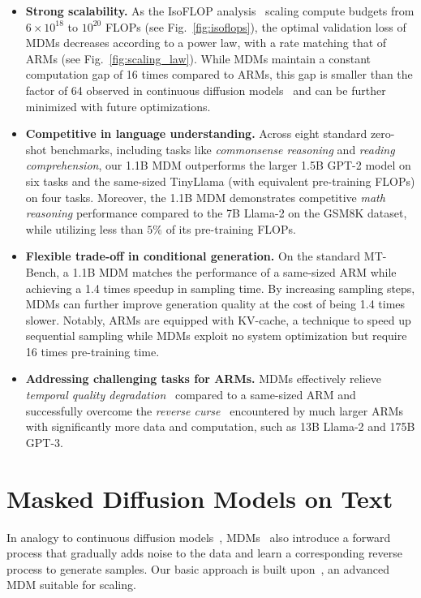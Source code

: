 \documentclass{article} %
\begin{document}
\begin{itemize}[leftmargin=*, itemsep=0pt]
    \item \textbf{Strong scalability.} As the IsoFLOP analysis~\citep{hoffmann2022training} scaling compute budgets from $6 \times 10^{18}$ to $10^{20}$ FLOPs (see Fig.~\ref{fig:isoflops}), the optimal validation loss of MDMs decreases according to a power law, with a rate matching that of ARMs (see Fig.~\ref{fig:scaling_law}). While MDMs maintain a constant computation gap of 16 times compared to ARMs, this gap is smaller than the factor of 64 observed in continuous diffusion models~\citep{gulrajani2024likelihood} and can be further minimized with future optimizations.
    \item \textbf{Competitive in language understanding.} Across eight standard zero-shot benchmarks, including tasks like \emph{commonsense reasoning} and \emph{reading comprehension}, our 1.1B MDM outperforms the larger 1.5B GPT-2 model on six tasks and the same-sized TinyLlama (with equivalent pre-training FLOPs) on four tasks. Moreover, the 1.1B MDM demonstrates competitive \emph{math reasoning} performance compared to the 7B Llama-2 on the GSM8K dataset, while utilizing less than $5\%$ of its pre-training FLOPs.
    \item \textbf{Flexible trade-off in conditional generation.} On the standard MT-Bench, a 1.1B MDM matches the performance of a same-sized ARM while achieving a 1.4 times speedup in sampling time. By increasing sampling steps, MDMs can further improve generation quality at the cost of being 1.4 times slower. Notably, ARMs are equipped with KV-cache, a technique to speed up sequential sampling while MDMs exploit no system optimization but require 16 times pre-training time.
    \item \textbf{Addressing challenging tasks for ARMs.} MDMs effectively relieve \emph{temporal quality degradation}~\citep{vela2022temporal} compared to a same-sized ARM and successfully overcome the \emph{reverse curse}~\citep{berglund2023reversal} encountered by much larger ARMs with significantly more data and computation, such as 13B Llama-2 and 175B GPT-3.
\end{itemize}



\section{Masked Diffusion Models on Text}
\label{sec:background}

In analogy to continuous diffusion models~\citep{sohl2015deep, ho2020denoising, song2020score}, MDMs~\citep{austin2021structured,lou2023discrete,ou2024your} also introduce a forward process that gradually adds noise to the data and learn a corresponding reverse process to generate samples. Our basic approach is built upon~\cite{ou2024your}, an advanced MDM suitable for scaling.
\end{document}
